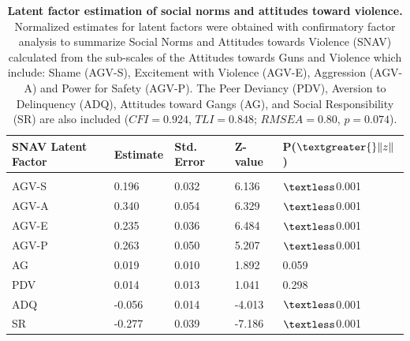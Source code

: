 \documentclass[utf8]{article}
\begin{document}
\begin{table}[]
\begin{tabular}{lllll}
SNAV Latent Factor & Estimate & Std. Error & Z-value & P($\textgreater{}\|z\|$) \\ \hline
                   &          &            &         &                          \\
AGV-S              & 0.196    & 0.032      & 6.136   & $\textless$0.001                    \\
AGV-A              & 0.340    & 0.054      & 6.329   & $\textless$0.001                    \\
AGV-E              & 0.235    & 0.036      & 6.484   & $\textless$0.001                    \\
AGV-P              & 0.263    & 0.050      & 5.207   & $\textless$0.001                    \\
AG                 & 0.019    & 0.010      & 1.892   & 0.059                    \\
PDV                & 0.014    & 0.013      & 1.041   & 0.298                    \\
ADQ                & -0.056   & 0.014      & -4.013  &$\textless$0.001                    \\
SR                 & -0.277   & 0.039      & -7.186  & $\textless$0.001                   
\end{tabular}
\caption{\textbf{Latent factor estimation of social norms and attitudes toward violence.} Normalized estimates for latent factors were obtained with confirmatory factor analysis to summarize Social Norms and Attitudes towards Violence (SNAV) calculated from the sub-scales of the Attitudes towards Guns and Violence which include: Shame (AGV-S), Excitement with Violence (AGV-E), Aggression (AGV-A) and Power for Safety (AGV-P). The Peer Deviancy (PDV), Aversion to Delinquency (ADQ), Attitudes toward Gangs (AG), and Social Responsibility (SR) are also included ($CFI=0.924$, $TLI=0.848$; $RMSEA=0.80$, $p=0.074$).\label{tab:9}}
\end{table}
\end{document}
